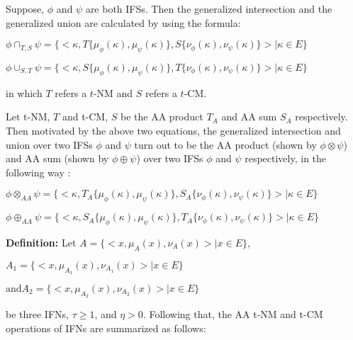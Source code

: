 \begin{flushleft}
Suppose, $\phi$ and $\psi$ are
both IFSs. Then the generalized intersection and the generalized union
are calculated by using the formula:

\vspace{3mm}

$\phi \cap_{T,S} \psi =\{< \kappa, T\{\mu_{\phi}(\kappa), \mu_{\psi}(\kappa)\}, S\{\nu_{\phi}(\kappa), \nu_{\psi}(\kappa)\}>| \kappa \in E \}$

$\phi \cup_{S,T} \psi =\{< \kappa, S\{\mu_{\phi}(\kappa), \mu_{\psi}(\kappa)\}, T\{\nu_{\phi}(\kappa), \nu_{\psi}(\kappa)\}>| \kappa \in E \}$

\vspace{3mm}

in which $T$ refers a $t$-NM and $S$ refers a $t$-CM.

\vspace{3mm}

Let t-NM, $T$ and t-CM, $S$ be the AA product $T_A$ and AA sum $S_A$ respectively.
Then motivated by the above two equations, the generalized intersection and
union over two IFSs $\phi$ and $\psi$ turn out to be the AA product (shown
by $\phi \otimes \psi$) and AA sum (shown by $\phi \oplus \psi$) over two IFSs $\phi$ and $\psi$
respectively, in the following way \cite{10}:
\vspace{3mm}

$\phi \otimes_{AA} \psi =\{< \kappa, T_A\{\mu_{\phi}(\kappa), \mu_{\psi}(\kappa)\}, S_A\{\nu_{\phi}(\kappa), \nu_{\psi}(\kappa)\}>| \kappa \in E \}$

$\phi \oplus_{AA} \psi =\{< \kappa, S_A\{\mu_{\phi}(\kappa), \mu_{\psi}(\kappa)\}, T_A\{\nu_{\phi}(\kappa), \nu_{\psi}(\kappa)\}>| \kappa \in E \}$


\vspace{3mm}

\textbf{Definition:} Let  $A=\{<x,\mu_A (x),\nu_A(x)> \vert x\in E\}$,

\vspace{3mm}

$A_1=\{<x,\mu_{A_1} (x),\nu_{A_1} (x)> \vert x\in E\}$ 

\vspace{3mm}

$\text{and} A_2=\{<x,\mu_{A_2} (x),\nu_{A_2} (x)> \vert x\in E\}$ 

\vspace{3mm}

be three IFNs, $\tau \geq 1$, and $\eta > 0$. Following that, the AA t-NM and t-CM operations of IFNs are summarized as follows:


\end{flushleft}
